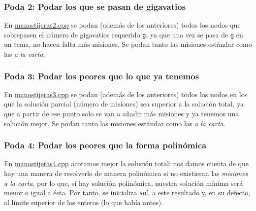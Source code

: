 \documentclass{article}
\begin{document}
	\subsubsection*{Poda 2: Podar los que se pasan de gigavatios}
	En \href{run:manostijeras2.cpp}{manostijeras2.cpp} se podan (además de los anteriores) todos los nodos que sobrepasen el número de gigavatios requerido \texttt{g}, ya que una vez se pasa de \texttt{g} en un tema, no hacen falta más misiones. Se podan tanto las misiones estándar como las \textit{a la carta}.\\
	
	\subsubsection*{Poda 3: Podar los peores que lo que ya tenemos}
	En \href{run:manostijeras3.cpp}{manostijeras3.cpp} se podan (además de los anteriores) todos los nodos en los que la solución parcial (número de misiones) sea superior a la solución total, ya que a partir de ese punto solo se van a añadir más misiones y ya tenemos una solución mejor. Se podan tanto las misiones estándar como las \textit{a la carta}.\\
	
	\subsubsection*{Poda 4: Podar los peores que la forma polinómica}
	En \href{run:manostijeras4.cpp}{manostijeras4.cpp} acotamos mejor la solución total: nos damos cuenta de que hay una manera de resolverlo de manera polinómica si no existieran las \textit{misiones a la carta}, por lo que, si hay solución polinómica, nuestra solución mínima será menor o igual a ésta. Por tanto, se inicializa \texttt{sol} a este resultado y, en su defecto, al límite superior de los enteros (lo que había antes).
	
	
	
    
\end{document}
